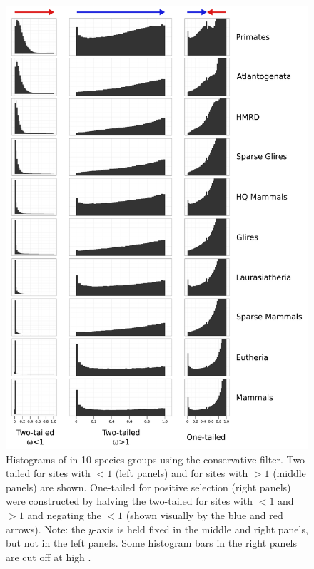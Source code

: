 \begin{figure}
\centering \scriptsize
\includegraphics[scale=0.32]{Figs/pset_pvals.pdf}
\caption{Histograms of \sw \pvs in 10 species groups using the
  conservative filter. Two-tailed \pvs for sites with \omgml$<1$ (left
  panels) and for sites with \omgml$>1$ (middle panels) are
  shown. One-tailed \pvs for positive selection (right panels) were
  constructed by halving the two-tailed \pvs for sites with \omgml$<1$
  and \omgml$>1$ and negating the \omgml$<1$ \pvs (shown visually by
  the blue and red arrows). Note: the $y$-axis is held fixed in the
  middle and right panels, but not in the left panels. Some histogram
  bars in the right panels are cut off at high \pvs.}
\label{fig_pset_pvals}
\end{figure}

